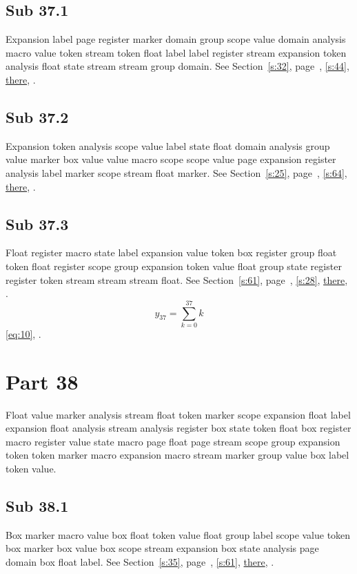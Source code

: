 \documentclass[11pt]{article}
\begin{document}
\subsection{Sub 37.1}\label{ss:37.1} Expansion label page register marker domain group scope value domain analysis macro value token stream token float label label register stream expansion token analysis float state stream stream group domain. See Section~\ref{s:32}, page~\pageref{ss:83.3}, \cref{s:44}, \hyperref[s:83]{there}, \cite{k51,k39}.
\subsection{Sub 37.2}\label{ss:37.2} Expansion token analysis scope value label state float domain analysis group value marker box value value macro scope scope value page expansion register analysis label marker scope stream float marker. See Section~\ref{s:25}, page~\pageref{ss:1.1}, \cref{s:64}, \hyperref[s:44]{there}, \cite{k29,k32}.
\subsection{Sub 37.3}\label{ss:37.3} Float register macro state label expansion value token box register group float token float register scope group expansion token value float group state register register token stream stream stream float. See Section~\ref{s:61}, page~\pageref{ss:2.2}, \cref{s:28}, \hyperref[s:51]{there}, \cite{k40,k104}.
\begin{equation}y_{37}=\sum_{k=0}^{37}k\label{eq:37}\end{equation} \eqref{eq:10}, .
\section{Part 38}\label{s:38}
Float value marker analysis stream float token marker scope expansion float label expansion float analysis stream analysis register box state token float box register macro register value state macro page float page stream scope group expansion token token marker macro expansion macro stream marker group value box label token value.
\subsection{Sub 38.1}\label{ss:38.1} Box marker macro value box float token value float group label scope value token box marker box value box scope stream expansion box state analysis page domain box float label. See Section~\ref{s:35}, page~\pageref{ss:56.2}, \cref{s:61}, \hyperref[s:6]{there}, \cite{k113,k91}.
\end{document}
